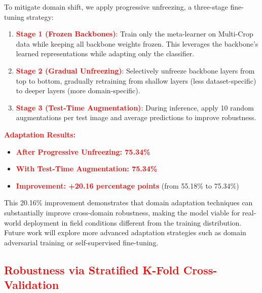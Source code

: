 {{To mitigate domain shift, we apply progressive unfreezing, a three-stage fine-tuning strategy:

\begin{enumerate}
\item \textbf{\textcolor{red}{Stage 1 (Frozen Backbones)}}: Train only the meta-learner on Multi-Crop data while keeping all backbone weights frozen. This leverages the backbone's learned representations while adapting only the classifier.
\item \textbf{\textcolor{red}{Stage 2 (Gradual Unfreezing)}}: Selectively unfreeze backbone layers from top to bottom, gradually retraining from shallow layers (less dataset-specific) to deeper layers (more domain-specific).
\item \textbf{\textcolor{red}{Stage 3 (Test-Time Augmentation)}}: During inference, apply 10 random augmentations per test image and average predictions to improve robustness.
\end{enumerate}

\textbf{\textcolor{red}{Adaptation Results:}}
\begin{itemize}
\item \textbf{\textcolor{red}{After Progressive Unfreezing: 75.34\%}}
\item \textbf{\textcolor{red}{With Test-Time Augmentation: 75.34\%}}
\item \textbf{\textcolor{red}{Improvement: +20.16 percentage points}} (from 55.18\% to 75.34\%)
\end{itemize}

This 20.16\% improvement demonstrates that domain adaptation techniques can substantially improve cross-domain robustness, making the model viable for real-world deployment in field conditions different from the training distribution. Future work will explore more advanced adaptation strategies such as domain adversarial training or self-supervised fine-tuning.
}

%
%

\subsection{\textcolor{red}{Robustness via Stratified K-Fold Cross-Validation}}

}
